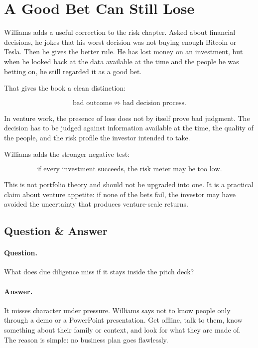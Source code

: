 \documentclass[11pt,oneside]{book}
\begin{document}
\section{A Good Bet Can Still Lose}

Williams adds a useful correction to the risk chapter. Asked about financial decisions, he jokes that his worst decision was not buying enough Bitcoin or Tesla. Then he gives the better rule. He has lost money on an investment, but when he looked back at the data available at the time and the people he was betting on, he still regarded it as a good bet.

That gives the book a clean distinction:

\begin{equation}
\text{bad outcome} \not\Rightarrow \text{bad decision process}.
\end{equation}

In venture work, the presence of loss does not by itself prove bad judgment. The decision has to be judged against information available at the time, the quality of the people, and the risk profile the investor intended to take.

Williams adds the stronger negative test:

\begin{equation}
\text{if every investment succeeds, the risk meter may be too low}.
\end{equation}

This is not portfolio theory and should not be upgraded into one. It is a practical claim about venture appetite: if none of the bets fail, the investor may have avoided the uncertainty that produces venture-scale returns.

\subsection{Question \& Answer}

\paragraph{Question.}
What does due diligence miss if it stays inside the pitch deck?

\paragraph{Answer.}
It misses character under pressure. Williams says not to know people only through a demo or a PowerPoint presentation. Get offline, talk to them, know something about their family or context, and look for what they are made of. The reason is simple: no business plan goes flawlessly.
\end{document}
